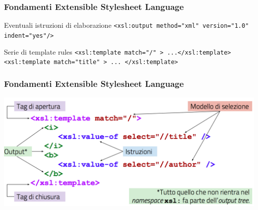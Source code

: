 \begin{frame}
    \frametitle{Fondamenti Extensible Stylesheet Language}
    \addtocounter{nframe}{1}
    

     \begin{block}{Eventuali istruzioni di elaborazione}
        \texttt{<xsl:output method="xml" version="1.0" indent="yes"/>}
     \end{block}

     \begin{block}{Serie di template rules}
        \texttt{<xsl:template match="/" > ...</xsl:template>} 
        \\\texttt{<xsl:template match="title" > ... </xsl:template>}
     \end{block}
    
\end{frame}

\begin{frame}
    \frametitle{Fondamenti Extensible Stylesheet Language}
    \addtocounter{nframe}{1}
    
    \begin{center}
        \includegraphics[width=.8\textwidth]{imgs/template-modello.png}
    \end{center}

\end{frame}

